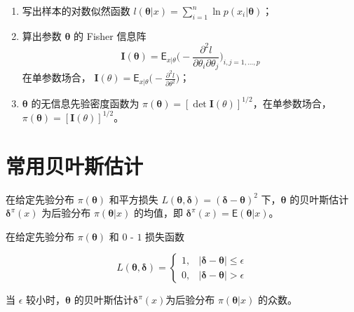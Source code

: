 \documentclass[12pt,a4paper,UTF8,twoside]{book}
\providecommand{\tightlist}{%
  \setlength{\itemsep}{0pt}\setlength{\parskip}{0pt}}
\theoremstyle{definition}
\theoremstyle{definition}
\theoremstyle{definition}
\theoremstyle{remark}
\let\BeginKnitrBlock\begin \let\EndKnitrBlock\end
\begin{document}
\begin{enumerate}
\def\labelenumi{\arabic{enumi}.}
\tightlist
\item
  写出样本的对数似然函数
  \(l(\boldsymbol{\theta}|x) = \sum_{i=1}^{n}\ln p(x_i | \boldsymbol{\theta})\)；
\item
  算出参数 \(\boldsymbol{\theta}\) 的 Fisher 信息阵
  \[\mathbf{I}(\boldsymbol{\theta}) = \mathsf{E}_{x|\theta} \big( - \frac{\partial^2 l}{\partial \theta_i \partial \theta_j} \big)_{i,j=1,\ldots,p}\]
  在单参数场合，
  \(\mathbf{I}(\theta) = \mathsf{E}_{x|\theta} \big( - \frac{\partial^2 l}{\partial \theta^2} \big)\)；
\item
  \(\boldsymbol{\theta}\) 的无信息先验密度函数为
  \(\pi(\boldsymbol{\theta}) = [\det \mathbf{I}(\theta) ]^{1/2}\)，在单参数场合，
  \(\pi(\boldsymbol{\theta}) = [\mathbf{I}(\theta) ]^{1/2}\)。
\end{enumerate}

\hypertarget{bayes-estimates}{%
\section{常用贝叶斯估计}\label{bayes-estimates}}

\BeginKnitrBlock{theorem}[平方损失]
\protect\hypertarget{thm:bayes-estimate-square}{}{\label{thm:bayes-estimate-square}
{} }在给定先验分布 \(\pi(\boldsymbol{\theta})\)
和平方损失
\(L(\boldsymbol{\theta},\boldsymbol{\delta}) = (\boldsymbol{\delta} - \boldsymbol{\theta})^2\)
下，\(\boldsymbol{\theta}\) 的贝叶斯估计
\(\boldsymbol{\delta}^{\pi}(x)\) 为后验分布
\(\pi(\boldsymbol{\theta}|x)\) 的均值，即
\(\boldsymbol{\delta}^{\pi}(x) = \mathsf{E}(\boldsymbol{\theta}|x)\)。
\EndKnitrBlock{theorem}

\BeginKnitrBlock{theorem}[0 - 1 损失]
\protect\hypertarget{thm:bayes-estimate-01}{}{\label{thm:bayes-estimate-01}
{} }在给定先验分布 \(\pi(\boldsymbol{\theta})\)
和 \(0\) - \(1\) 损失函数

\begin{equation*}
L(\boldsymbol{\theta},\boldsymbol{\delta}) = 
\begin{cases}
1, & | \boldsymbol{\delta} - \boldsymbol{\theta}| \leq \epsilon \\
0, & | \boldsymbol{\delta} - \boldsymbol{\theta}| > \epsilon
\end{cases}
\end{equation*}

当 \(\epsilon\) 较小时，\(\boldsymbol{\theta}\)
的贝叶斯估计\(\boldsymbol{\delta}^{\pi}(x)\)为后验分布
\(\pi(\boldsymbol{\theta}|x)\) 的众数。
\EndKnitrBlock{theorem}
\end{document}
